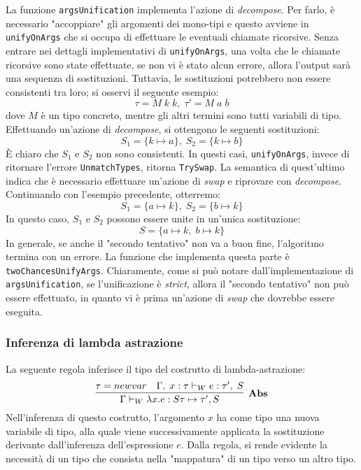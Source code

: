 \documentclass[10pt,a4paper]{article}
\begin{document}
La funzione \texttt{argsUnification} implementa l'azione di \textit{decompose}. Per farlo, è necessario "accoppiare" gli
argomenti dei mono-tipi e questo avviene in \texttt{unifyOnArgs} che si occupa di effettuare le eventuali chiamate
ricorsive. Senza entrare nei dettagli implementativi di \texttt{unifyOnArgs}, una volta che le chiamate ricorsive sono
state effettuate, se non vi è stato alcun errore, allora l'output sarà una sequenza di sostituzioni. Tuttavia, le
sostituzioni potrebbero non essere consistenti tra loro; si osservi il seguente esempio:
\[ \tau = M \; k \; k, \; \tau' = M \; a \; b \]
dove $ M $ è un tipo concreto, mentre gli altri termini sono tutti variabili di tipo. Effettuando un'azione di
\textit{decompose}, si ottengono le seguenti sostituzioni:
\[ S_1 = \{k \mapsto a\}, \; S_2 = \{k \mapsto b\} \]
\`E chiaro che $ S_1 $ e $ S_2 $ non sono consistenti. In questi casi, \texttt{unifyOnArgs}, invece di ritornare
l'errore \texttt{UnmatchTypes}, ritorna \texttt{TrySwap}. La semantica di quest'ultimo indica che è necessario effettuare
un'azione di \textit{swap} e riprovare con \textit{decompose}. Continuando con l'esempio precedente, otterremo:
\[ S_1 = \{a \mapsto k\}, \; S_2 = \{b \mapsto k\} \]
In questo caso, $ S_1 $ e $ S_2 $ possono essere unite in un'unica sostituzione:
\[ S = \{ a \mapsto k, \; b \mapsto k \} \]
In generale, se anche il "secondo tentativo" non va a buon fine, l'algoritmo termina con un errore. La funzione che
implementa questa parte è \texttt{twoChancesUnifyArgs}. Chiaramente, come si può notare dall'implementazione di
\texttt{argsUnification}, se l'unificazione è \textit{strict}, allora il "secondo tentativo" non può essere effettuato,
in quanto vi è prima un'azione di \textit{swap} che dovrebbe essere eseguita.

\hypertarget{Inferenza di lambda astrazione}{\subsubsection{Inferenza di lambda astrazione}}
La seguente regola inferisce il tipo del costrutto di lambda-astrazione:
\[ \infer[\textbf{Abs}]{\Gamma \vdash_W \lambda x. e : S\tau \mapsto \tau', S}{\tau = newvar & \Gamma, \; x : \tau \vdash_W e : \tau', \; S} \]
Nell'inferenza di questo costrutto, l'argomento $ x $ ha come tipo una nuova variabile di tipo, alla quale viene
successivamente applicata la sostituzione derivante dall'inferenza dell'espressione $ e $. Dalla regola, si rende evidente
la necessità di un tipo che consista nella "mappatura" di un tipo verso un altro tipo.
\end{document}
